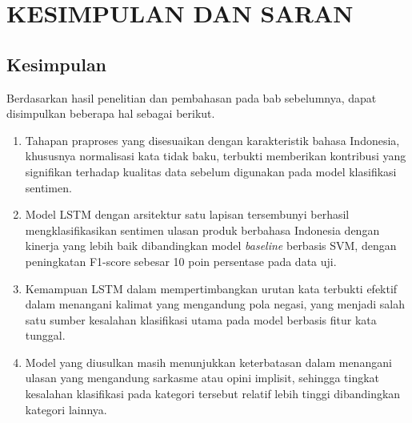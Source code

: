 
\chapter{KESIMPULAN DAN SARAN}

\section{Kesimpulan}
Berdasarkan hasil penelitian dan pembahasan pada bab sebelumnya, dapat
disimpulkan beberapa hal sebagai berikut.
\begin{enumerate}
  \item Tahapan praproses yang disesuaikan dengan karakteristik
        bahasa Indonesia, khususnya normalisasi kata tidak baku,
        terbukti memberikan kontribusi yang signifikan terhadap
        kualitas data sebelum digunakan pada model klasifikasi
        sentimen.
  \item Model LSTM dengan arsitektur satu lapisan tersembunyi berhasil
        mengklasifikasikan sentimen ulasan produk berbahasa Indonesia
        dengan kinerja yang lebih baik dibandingkan model
        \textit{baseline} berbasis SVM, dengan peningkatan F1-score
        sebesar 10 poin persentase pada data uji.
  \item Kemampuan LSTM dalam mempertimbangkan urutan kata terbukti
        efektif dalam menangani kalimat yang mengandung pola negasi,
        yang menjadi salah satu sumber kesalahan klasifikasi utama
        pada model berbasis fitur kata tunggal.
  \item Model yang diusulkan masih menunjukkan keterbatasan dalam
        menangani ulasan yang mengandung sarkasme atau opini implisit,
        sehingga tingkat kesalahan klasifikasi pada kategori tersebut
        relatif lebih tinggi dibandingkan kategori lainnya.
\end{enumerate}

